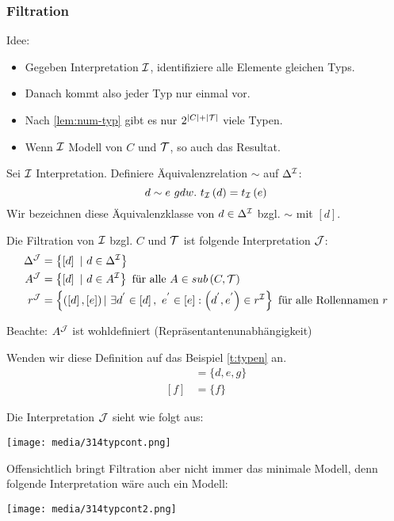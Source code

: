 \subsubsection{Filtration}\label{filtration}
Idee:

\begin{itemize}
  \item Gegeben Interpretation $\mathcal{I}$, identifiziere alle Elemente gleichen Typs.
  \item Danach kommt also jeder Typ nur einmal vor.
  \item Nach \autoref{lem:num-typ} gibt es nur $2^{|C|+|\mathcal{T}|}$ viele Typen.
  \item Wenn $\mathcal{I}$ Modell von $C$ und $\mathcal{T}$, so auch das Resultat.
\end{itemize}

\begin{definition}[Filtration]

Sei $\mathcal{I}$ Interpretation. Definiere Äquivalenzrelation $\sim$ auf
$\Delta^{\mathcal{I}}$: $$d \sim e\ gdw.\ t_{\mathcal{I}}\left( d \right) = t_{\mathcal{I}}\left( e \right)$$
Wir bezeichnen diese Äquivalenzklasse von $d \in \Delta^{\mathcal{I}}$ bzgl. $\sim$ mit $\left\lbrack d \right\rbrack$.

Die Filtration von $\mathcal{I}$ bzgl. $C$ und $\mathcal{T}$ ist folgende Interpretation $\mathcal{J}$:
\begin{align*}
    \Delta^{\mathcal{J}} &= \left\{ \left\lbrack d \right\rbrack\ |\ d \in \Delta^{\mathcal{I}} \right\}\\
    A^{\mathcal{J}} &= \left\{ \left\lbrack d \right\rbrack\ |\ d \in A^{\mathcal{I}} \right\}
  \text{ für alle }A \in sub\left( C,\mathcal{T} \right)\\
  r^{\mathcal{J}} &= \left\{ \left( \left\lbrack d \right\rbrack,\left\lbrack e \right\rbrack \right)|\ \exists d^{'} \in \left\lbrack d \right\rbrack,\ e^{'} \in \left\lbrack e \right\rbrack:\left( d^{'},e^{'} \right) \in r^{\mathcal{I}} \right\}
  \text{ für alle Rollennamen } r
\end{align*}

Beachte: $A^{\mathcal{J}}$ ist wohldefiniert (Repräsentantenunabhängigkeit)
\end{definition}

\setcounter{tafel}{9}
\begin{tafel} [Fortsetzung]
Wenden wir diese Definition auf das Beispiel \autoref{t:typen} an.
\begin{align*}
    [d]&=\{d,e,g\}\\
    [f]&=\{f\}
\end{align*}

Die Interpretation $\mathcal{J}$ sieht wie folgt aus:

\texttt{[image: media/314typcont.png]}

Offensichtlich bringt Filtration aber nicht immer das minimale Modell, denn folgende Interpretation wäre auch ein Modell:

\texttt{[image: media/314typcont2.png]}
\end{tafel}


